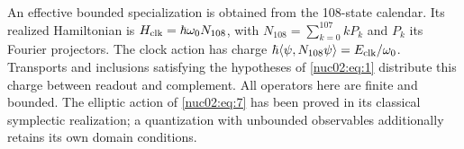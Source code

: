 An effective bounded specialization is obtained from the 108-state calendar. Its realized Hamiltonian is \(H_{\rm clk}=\hbar\omega_0N_{108}\), with \(N_{108}=\sum_{k=0}^{107}kP_k\) and \(P_k\) its Fourier projectors. The clock action has charge \(\hbar\langle\psi,N_{108}\psi\rangle=E_{\rm clk}/\omega_0\). Transports and inclusions satisfying the hypotheses of \eqref{nuc02:eq:1} distribute this charge between readout and complement. All operators here are finite and bounded. The elliptic action of \eqref{nuc02:eq:7} has been proved in its classical symplectic realization; a quantization with unbounded observables additionally retains its own domain conditions.
